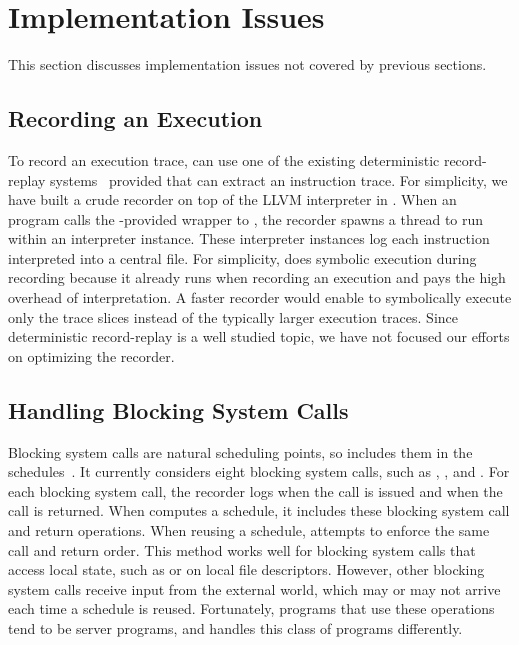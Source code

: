 \section{Implementation Issues} \label{sec:peregrine-impl}

This section discusses implementation issues not covered by previous sections.

\subsection{Recording an Execution} \label{sec:peregrine-record}

To record an execution trace, \peregrine can use one of the existing
deterministic record-replay
systems~\cite{scribe:sigmetrics10,smp-revirt:vee08,idna:vee06} provided
that \peregrine can extract an instruction trace.  For simplicity, we have built
a crude recorder on top of the LLVM interpreter in \klee.  When an program
calls the \peregrine-provided wrapper to ,
the recorder spawns a thread to run 
within an interpreter instance.  These interpreter instances log
each instruction interpreted into a central file.
For simplicity, \peregrine does symbolic execution during recording because it
already runs \klee when recording an execution and pays the high overhead
of interpretation.  A faster recorder would enable \peregrine to
symbolically execute only the trace slices instead of the typically larger
execution traces.  Since deterministic record-replay is a well
studied topic, we have not focused our efforts on optimizing the recorder.


\subsection{Handling Blocking System Calls}

Blocking system calls are natural scheduling points, so \peregrine includes them
in the schedules~\cite{cui:tern:osdi10}.  It currently considers eight
blocking system calls, such as ,
, and .  For each blocking system call, the recorder
logs when the call is issued and when the call is returned.  When \peregrine
computes a schedule, it includes these blocking system call and return
operations.  When reusing a schedule, \peregrine attempts to enforce the same
call and return order.  This method works well for blocking system calls
that access local state, such as  or  on local file
descriptors.  However, other blocking system calls receive input from
the external world, which may or may not arrive each time a
schedule is reused.  Fortunately, programs that use these operations tend to be
server programs, and \peregrine handles this class of programs differently.

